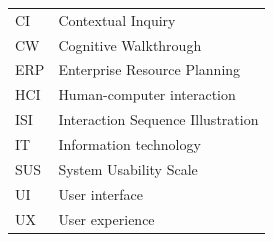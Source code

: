 \documentclass[12pt,a4paper,oneside,pdftex]{report}
\begin{document}
\noindent
\begin{longtable}{@{}p{}p{}@{}}
CI & Contextual Inquiry \\
CW & Cognitive Walkthrough\\
ERP & Enterprise Resource Planning \\
HCI & Human-computer interaction \\
ISI & Interaction Sequence Illustration \\
IT & Information technology \\
SUS & System Usability Scale \\
UI & User interface \\
UX & User experience \\



\end{longtable}


\cleardoublepage
\tableofcontents



\label{pages-prelude}
\cleardoublepage

\startfirstchapter
\end{document}
